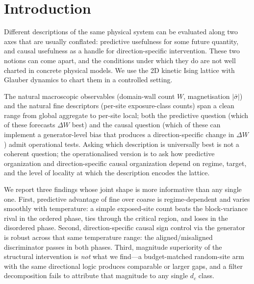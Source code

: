 \documentclass[aps,pre,preprint,superscriptaddress,showpacs]{revtex4-2}
\begin{document}

\maketitle

\section{Introduction}
\label{sec:intro}

Different descriptions of the same physical system can be evaluated
along two axes that are usually conflated: predictive usefulness for
some future quantity, and causal usefulness as a handle for
direction-specific intervention.
These two notions can come apart, and the conditions under which they
do are not well charted in concrete physical models.
We use the 2D kinetic Ising lattice with Glauber dynamics to chart
them in a controlled setting.

The natural macroscopic observables (domain-wall count $W$,
magnetisation $|\bar\sigma|$) and the natural fine descriptors
(per-site exposure-class counts) span a clean range from global
aggregate to per-site local; both the predictive question (which of
these forecasts $\Delta W$ best) and the causal question (which of
these can implement a generator-level bias that produces a
direction-specific change in $\Delta W$) admit operational tests.
Asking which description is universally best is not a coherent
question; the operationalised version is to ask how predictive
organization and direction-specific causal organization depend on
regime, target, and the level of locality at which the description
encodes the lattice.

We report three findings whose joint shape is more informative than
any single one.
First, predictive advantage of fine over coarse is regime-dependent
and varies smoothly with temperature: a simple exposed-site count
beats the block-variance rival in the ordered phase, ties through the
critical region, and loses in the disordered phase.
Second, direction-specific causal sign control via the generator is
robust across that same temperature range: the aligned/misaligned
discriminator passes in both phases.
Third, magnitude superiority of the structural intervention is
\emph{not} what we find---a budget-matched random-site arm with the
same directional logic produces comparable or larger gaps, and a
filter decomposition fails to attribute that magnitude to any single
$d_c$ class.
\end{document}
